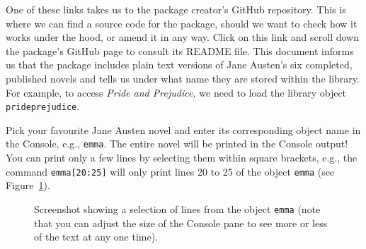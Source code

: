 \documentclass[
  letterpaper,
  DIV=11,
  numbers=noendperiod,
  oneside]{scrreprt}
\begin{document}
One of these links takes us to the package creator's GitHub repository.
This is where we can find a source code for the package, should we want
to check how it works under the hood, or amend it in any way. Click on
this link and scroll down the package's GitHub page to consult its
README file. This document informs us that the package includes plain
text versions of Jane Austen's six completed, published novels and tells
us under what name they are stored within the library. For example, to
access \emph{Pride and Prejudice,} we need to load the library object
\texttt{prideprejudice}. {}

Pick your favourite Jane Austen novel and enter its corresponding object
name in the Console, e.g., \texttt{emma}. The entire novel will be
printed in the Console output! You can print only a few lines by
selecting them within square brackets, e.g., the command
\texttt{emma{[}20:25{]}} will only print lines 20 to 25 of the object
\texttt{emma} (see Figure~\ref{fig-emma2025}).

\begin{figure}


\caption{\label{fig-emma2025}Screenshot showing a selection of lines
from the object \texttt{emma} (note that you can adjust the size of the
Console pane to see more or less of the text at any one time).}

\end{figure}%
\end{document}
